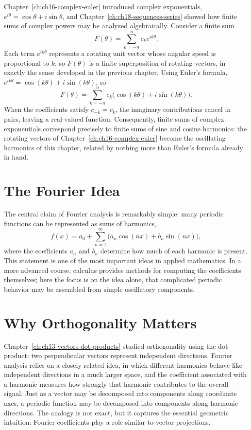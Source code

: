 Chapter~\ref{ch:ch16-complex-euler} introduced complex exponentials,
$e^{i\theta} = \cos\theta + i\sin\theta$, and
Chapter~\ref{ch:ch18-sequences-series} showed how finite sums of complex
powers may be analyzed algebraically. Consider a finite sum
\[
F(\theta) = \sum_{k=-n}^{n} c_k e^{ik\theta}.
\]
Each term $e^{ik\theta}$ represents a rotating unit vector whose angular
speed is proportional to $k$, so $F(\theta)$ is a finite superposition of
rotating vectors, in exactly the sense developed in the previous chapter.
Using Euler's formula, $e^{ik\theta} = \cos(k\theta) + i\sin(k\theta)$,
so
\[
F(\theta) = \sum_{k=-n}^{n} c_k\bigl(\cos(k\theta) + i\sin(k\theta)\bigr).
\]
When the coefficients satisfy $c_{-k} = \overline{c_k}$, the imaginary
contributions cancel in pairs, leaving a real-valued function.
Consequently, finite sums of complex exponentials correspond precisely
to finite sums of sine and cosine harmonics: the rotating vectors of
Chapter~\ref{ch:ch16-complex-euler} become the oscillating harmonics of
this chapter, related by nothing more than Euler's formula already in
hand.

\section{The Fourier Idea}

The central claim of Fourier analysis is remarkably simple: many
periodic functions can be represented as sums of harmonics,
\[
f(x) = a_0 + \sum_{n=1}^{\infty} \bigl(a_n\cos(nx) + b_n\sin(nx)\bigr),
\]
where the coefficients $a_n$ and $b_n$ determine how much of each
harmonic is present. This statement is one of the most important ideas
in applied mathematics. In a more advanced course, calculus provides
methods for computing the coefficients themselves; here the focus is on
the idea alone, that complicated periodic behavior may be assembled from
simple oscillatory components.

\section{Why Orthogonality Matters}

Chapter~\ref{ch:ch13-vectors-dot-products} studied orthogonality using
the dot product: two perpendicular vectors represent independent
directions. Fourier analysis relies on a closely related idea, in which
different harmonics behave like independent directions in a much larger
space, and the coefficient associated with a harmonic measures how
strongly that harmonic contributes to the overall signal. Just as a
vector may be decomposed into components along coordinate axes, a
periodic function may be decomposed into components along harmonic
directions. The analogy is not exact, but it captures the essential
geometric intuition: Fourier coefficients play a role similar to vector
projections.

